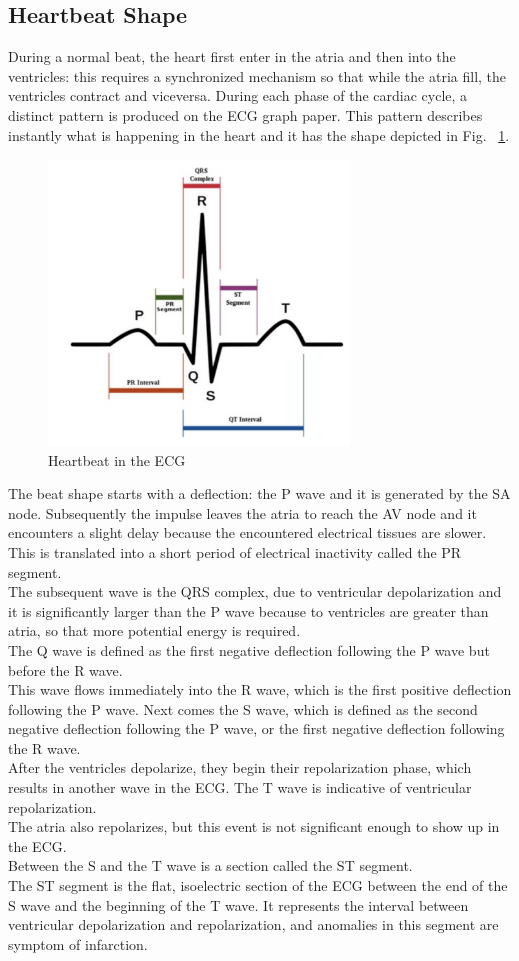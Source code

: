 \documentclass[LaM,binding=0.6cm]{sapthesis}
\begin{document}
\subsection{Heartbeat Shape}
During a normal beat, the heart first enter in the atria and then into the ventricles: this requires a synchronized mechanism so that while the atria fill, the ventricles contract and viceversa. During each phase of the cardiac cycle, a distinct pattern is produced on the ECG graph paper. This pattern describes instantly what is happening in the heart and it has the shape depicted in Fig. ~\ref{fig:beatshape}.
\begin{figure}[H]  \centering
	\includegraphics[width=80mm,scale=0.7]{beatshape}
	\caption{Heartbeat in the ECG}
	\label{fig:beatshape}
\end{figure}
The beat shape starts with a deflection: the P wave and it is generated by the SA node. Subsequently the impulse leaves the atria to reach the AV node and it encounters a slight delay because the encountered electrical tissues are slower. This is translated into a short period of electrical inactivity called the PR segment.\\The subsequent wave is the QRS complex, due to ventricular depolarization and it is significantly larger than the P wave because to  ventricles are greater than atria, so that more potential energy is required.\\The Q wave is defined as the first negative deflection following the P wave but before the R wave.\\This wave flows immediately into the R wave, which is the first positive deflection following the P wave. Next comes the S wave, which is defined as the second negative deflection following the P wave, or the first negative deflection following the R wave.\\After the ventricles depolarize, they begin their repolarization phase, which results in another wave in the ECG. The T wave is indicative of ventricular repolarization.\\The atria also repolarizes, but this event is not significant enough to show up in the ECG.\\Between the S and the T wave is a section called the ST segment.\\The ST segment is the flat, isoelectric section of the ECG between the end of the S wave and the beginning of the T wave. It represents the interval between ventricular depolarization and repolarization, and anomalies in this segment are symptom of infarction.
\end{document}
